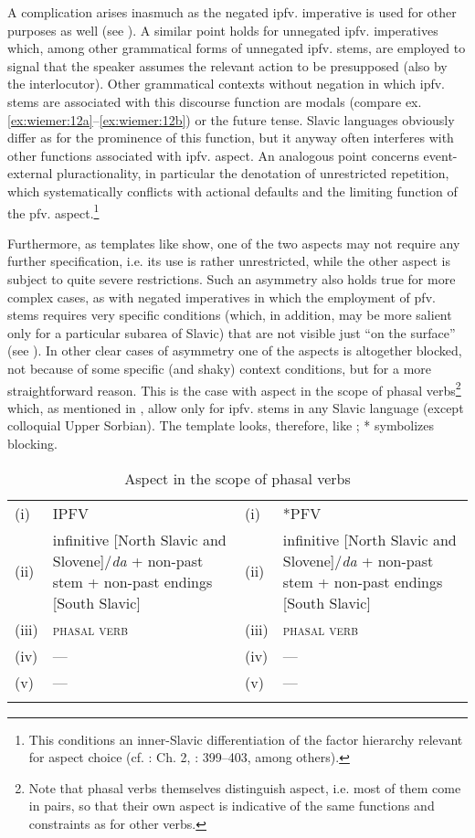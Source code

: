 \documentclass[output=paper]{langscibook}
\begin{document}
A complication arises inasmuch as the negated ipfv. imperative is used for other purposes as well (see ). A similar point holds for unnegated ipfv. imperatives which, among other grammatical forms of unnegated ipfv. stems, are employed to signal that the speaker assumes the relevant action to be presupposed (also by the interlocutor). Other grammatical contexts without negation in which ipfv. stems are associated with this discourse function are modals (compare ex. \ref{ex:wiemer:12a}--\ref{ex:wiemer:12b}) or the future tense. Slavic languages obviously differ as for the prominence of this function, but it anyway often interferes with other functions associated with ipfv. aspect. An analogous point concerns event-external pluractionality, in particular the denotation of unrestricted repetition, which systematically conflicts with actional defaults and the limiting function of the pfv. aspect.\footnote{This conditions an inner-Slavic differentiation of the factor hierarchy relevant for aspect choice (cf. \citealt{Dickey2000}: Ch. 2, \citealt{Wiemer2008}: 399--403, among others).}

Furthermore, as templates like  show, one of the two aspects may not require any further specification, i.e. its use is rather unrestricted, while the other aspect is subject to quite severe restrictions. Such an asymmetry also holds true for more complex cases, as with negated imperatives in which the employment of pfv. stems requires very specific conditions (which, in addition, may be more salient only for a particular subarea of Slavic) that are not visible just “on the surface” (see \citealt{WiemerForthcoming}). In other clear cases of asymmetry one of the aspects is altogether blocked, not because of some specific (and shaky) context conditions, but for a more straightforward reason. This is the case with aspect in the scope of phasal verbs\footnote{Note that phasal verbs themselves distinguish aspect, i.e. most of them come in pairs, so that their own aspect is indicative of the same functions and constraints as for other verbs.} which, as mentioned in , allow only for ipfv. stems in any Slavic language (except colloquial Upper Sorbian). The template looks, therefore, like ; * symbolizes blocking.

\begin{table}
\caption{Aspect in the scope of phasal verbs}
\label{tab:wiemer:zy}
\begin{tabularx}{\textwidth}{l@{ }Ql@{ }Q}
\lsptoprule
(i)   & IPFV &  (i) & *PFV\\
(ii)  & infinitive [North Slavic and Slovene]\slash\textit{da} + non-past stem + non-past endings [South Slavic] & (ii) & infinitive [North Slavic and Slovene]\slash \textit{da} + non-past stem + non-past endings [South Slavic]\\
(iii) & \textsc{phasal verb} & (iii) & \textsc{phasal verb}\\
(iv)  & {}--- & (iv) & {}---\\
(v)   & {}--- & (v) & {}---\\
\lspbottomrule
\end{tabularx}
\end{table}
\end{document}
